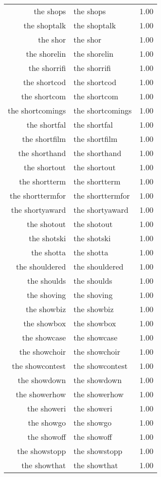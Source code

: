 \begin{table}[ht]
\begin{tabular}{rlr}
  the shops & the shops & 1.00 \\ 
  the shoptalk & the shoptalk & 1.00 \\ 
  the shor & the shor & 1.00 \\ 
  the shorelin & the shorelin & 1.00 \\ 
  the shorrifi & the shorrifi & 1.00 \\ 
  the shortcod & the shortcod & 1.00 \\ 
  the shortcom & the shortcom & 1.00 \\ 
  the shortcomings & the shortcomings & 1.00 \\ 
  the shortfal & the shortfal & 1.00 \\ 
  the shortfilm & the shortfilm & 1.00 \\ 
  the shorthand & the shorthand & 1.00 \\ 
  the shortout & the shortout & 1.00 \\ 
  the shortterm & the shortterm & 1.00 \\ 
  the shorttermfor & the shorttermfor & 1.00 \\ 
  the shortyaward & the shortyaward & 1.00 \\ 
  the shotout & the shotout & 1.00 \\ 
  the shotski & the shotski & 1.00 \\ 
  the shotta & the shotta & 1.00 \\ 
  the shouldered & the shouldered & 1.00 \\ 
  the shoulds & the shoulds & 1.00 \\ 
  the shoving & the shoving & 1.00 \\ 
  the showbiz & the showbiz & 1.00 \\ 
  the showbox & the showbox & 1.00 \\ 
  the showcase & the showcase & 1.00 \\ 
  the showchoir & the showchoir & 1.00 \\ 
  the showcontest & the showcontest & 1.00 \\ 
  the showdown & the showdown & 1.00 \\ 
  the showerhow & the showerhow & 1.00 \\ 
  the showeri & the showeri & 1.00 \\ 
  the showgo & the showgo & 1.00 \\ 
  the showoff & the showoff & 1.00 \\ 
  the showstopp & the showstopp & 1.00 \\ 
  the showthat & the showthat & 1.00 \\ 

\end{tabular}
\end{table}
